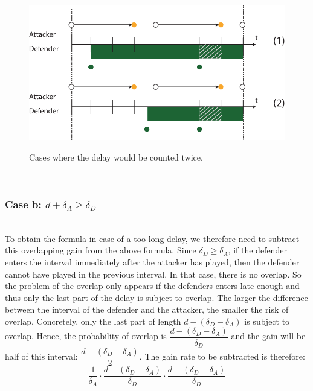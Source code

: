 \begin{figure}[hbtp]
\centering
\caption{Cases where the delay would be counted twice.}
\includegraphics[scale=0.7]{Images/flipcase2nb.pdf}
\label{countedtwice}
\end{figure}

~~ \\
\subsubsection*{\textbf{Case b:} $d + \delta_{A} \geq \delta_{D}$}
~~~\\

To obtain the formula in case of a too long delay, we therefore need to subtract this overlapping gain from the above formula. 
Since $\delta_{D} \geq \delta_{A}$, if the defender enters the interval immediately after the attacker has played, then the defender cannot have played in the previous interval. In that case, there is no overlap. So the problem of the overlap only appears if the defenders enters late enough and thus only the last part of the delay is subject to overlap. The larger the difference between the interval of the defender and the attacker, the smaller the risk of overlap. Concretely, only the last part of length $d - (\delta_{D} - \delta_{A})$ is subject to overlap. Hence, the probability of overlap is $\dfrac{ d - (\delta_{D} - \delta_{A})}{\delta_{D}}$ and the gain will be half of this interval:  $\dfrac{ d - (\delta_{D} - \delta_{A})}{2}$.  The gain rate to be subtracted is therefore:\\

\begin{equation*}
\dfrac{1} {\delta_{A}} \cdot \dfrac{d - (\delta_{D} - \delta_{A})}{\delta_{D}} \cdot \dfrac{d - (\delta_{D} - \delta_{A})}{\delta_{D}}
\end{equation*}

